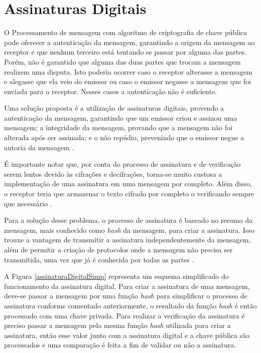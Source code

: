 \section{Assinaturas Digitais}

O Processamento de mensagem com algoritmo de criptografia de chave pública pode oferecer a autenticação da mensagem, garantindo a origem da mensagem ao receptor e que nenhum terceiro está tentando se passar por alguma das partes. Porém, não é garantido que alguma das duas partes que trocam a mensagem realizem uma disputa. Isto poderia ocorrer caso o receptor alterasse a mensagem e alegasse que ela veio do emissor ou caso o emissor negasse a mensagem que foi enviada para o receptor. Nesses casos a autenticação não é suficiente. 

Uma solução proposta é a utilização de assinaturas digitais, provendo a autenticação da mensagem, garantindo que um emissor criou e assinou uma mensagem; a integridade da mensagem, provando que a mensagem não foi alterada após ser assinada; e o não repúdio, prevenindo que o emissor negue a autoria da mensagem \cite{johnson2001elliptic}.

É importante notar que, por conta do processo de assinatura e de verificação serem lentos devido às cifrações e decifrações, torna-se muito custosa a implementação de uma assinatura em uma mensagem por completo. Além disso, o receptor teria que armazenar o texto cifrado por completo o verificando sempre que necessário \cite{diffie1998}.

Para a solução desse problema, o processo de assinatura é baseado no resumo da mensagem, mais conhecido como \textit{hash} da mensagem, para criar a assinatura. Isso trouxe a vantagem de transmitir a assinatura independentemente da mensagem, além de permitir a criação de protocolos onde a mensagem não precisa ser transmitida, uma vez que já é conhecida por todas as partes \cite{diffie1998}.

A Figura \ref{assinaturaDigitalSimp} representa um esquema simplificado do funcionamento da assinatura digital. Para criar a assinatura de uma mensagem, deve-se passar a mensagem por uma função \textit{hash} para simplificar o processo de assinatura conforme comentado anteriormente, o resultado da função \textit{hash} é então processado com uma chave privada. Para realizar a verificação da assinatura é preciso passar a mensagem pela mesma função \textit{hash} utilizada para criar a assinatura, então esse valor junto com a assinatura digital e a chave pública são processados e uma comparação é feita a fim de validar ou não a assinatura.


